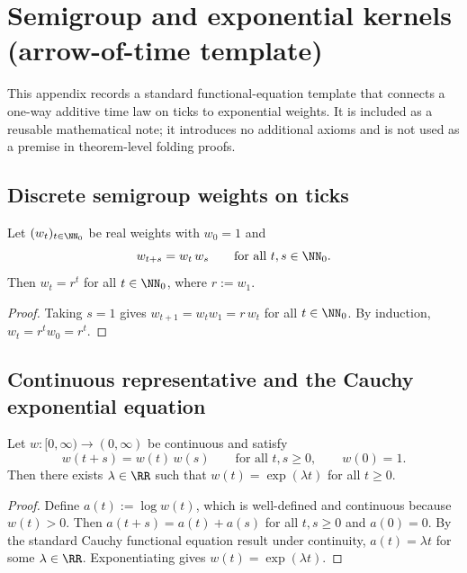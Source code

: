 \section{Semigroup and exponential kernels (arrow-of-time template)}
\label{app:arrow_of_time_semigroup_notes}

\AuditTag This appendix records a standard functional-equation template that connects a one-way additive time law on ticks to exponential weights.
It is included as a reusable mathematical note; it introduces no additional axioms and is not used as a premise in theorem-level folding proofs.

\subsection{Discrete semigroup weights on ticks}
\label{subsec:arrow_time_discrete_semigroup}

\begin{proposition}\label{prop:discrete_memoryless_exponential}
\MathTag Let $(w_t)_{t\in\NN_0}$ be real weights with $w_0=1$ and
\[
w_{t+s}=w_t\,w_s\qquad\text{for all }t,s\in\NN_0.
\]
Then $w_t=r^t$ for all $t\in\NN_0$, where $r:=w_1$.
\end{proposition}
\begin{proof}
Taking $s=1$ gives $w_{t+1}=w_t w_1=r\,w_t$ for all $t\in\NN_0$.
By induction,
$
w_t=r^t w_0=r^t.
$
\end{proof}

\subsection{Continuous representative and the Cauchy exponential equation}
\label{subsec:arrow_time_continuous_exponential}

\begin{proposition}\label{prop:continuous_semigroup_exponential}
\MathTag Let $w:[0,\infty)\to(0,\infty)$ be continuous and satisfy
\[
w(t+s)=w(t)\,w(s)\qquad\text{for all }t,s\ge 0,\qquad w(0)=1.
\]
Then there exists $\lambda\in\RR$ such that $w(t)=\exp(\lambda t)$ for all $t\ge 0$.
\end{proposition}
\begin{proof}
Define $a(t):=\log w(t)$, which is well-defined and continuous because $w(t)>0$.
Then $a(t+s)=a(t)+a(s)$ for all $t,s\ge 0$ and $a(0)=0$.
By the standard Cauchy functional equation result under continuity, $a(t)=\lambda t$ for some $\lambda\in\RR$.
Exponentiating gives $w(t)=\exp(\lambda t)$.
\end{proof}

